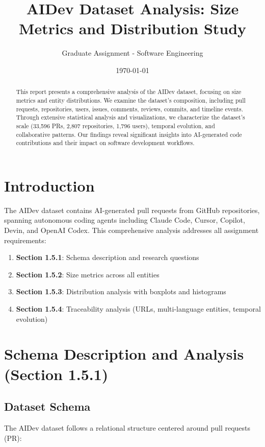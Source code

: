 \documentclass[11pt]{article}
\title{\textbf{AIDev Dataset Analysis: Size Metrics and Distribution Study}}
\author{Graduate Assignment - Software Engineering}
\date{\today}
\begin{document}
\maketitle

\begin{abstract}
This report presents a comprehensive analysis of the AIDev dataset, focusing on size metrics and entity distributions. We examine the dataset's composition, including pull requests, repositories, users, issues, comments, reviews, commits, and timeline events. Through extensive statistical analysis and visualizations, we characterize the dataset's scale (33,596 PRs, 2,807 repositories, 1,796 users), temporal evolution, and collaborative patterns. Our findings reveal significant insights into AI-generated code contributions and their impact on software development workflows.
\end{abstract}

\section{Introduction}

The AIDev dataset contains AI-generated pull requests from GitHub repositories, spanning autonomous coding agents including Claude Code, Cursor, Copilot, Devin, and OpenAI Codex. This comprehensive analysis addresses all assignment requirements:

\begin{enumerate}
    \item \textbf{Section 1.5.1}: Schema description and research questions
    \item \textbf{Section 1.5.2}: Size metrics across all entities
    \item \textbf{Section 1.5.3}: Distribution analysis with boxplots and histograms
    \item \textbf{Section 1.5.4}: Traceability analysis (URLs, multi-language entities, temporal evolution)
\end{enumerate}

\section{Schema Description and Analysis (Section 1.5.1)}

\subsection{Dataset Schema}

The AIDev dataset follows a relational structure centered around pull requests (PR):
\end{document}
